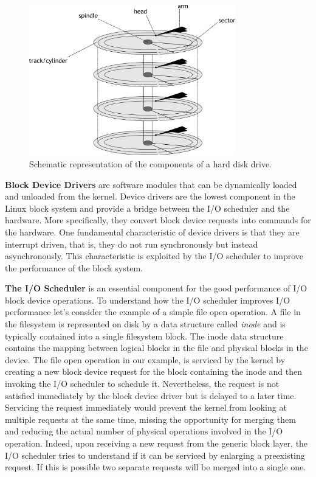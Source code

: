 \begin{figure}[!htb]
  \centering
  \includegraphics[width=0.8\textwidth]{chapters/figures/hdd}
  \caption{Schematic representation of the components of a hard disk drive.}
  \label{figure: hdd}
\end{figure}

\vspace{5mm}
\textbf{Block Device Drivers} are software modules that can be dynamically loaded and unloaded from the kernel. Device drivers are the lowest component in the Linux block system and provide a bridge
between the I/O scheduler and the hardware. More specifically, they convert block device requests into commands for the hardware. One fundamental characteristic of device drivers is that they are 
interrupt driven, that is, they do not run synchronously but instead asynchronously. This characteristic is exploited by the I/O scheduler to improve the performance of the block system.

\vspace{5mm}
\textbf{The I/O Scheduler} is an essential component for the good performance of I/O block device operations. To understand how the I/O scheduler improves I/O performance let's consider the example of 
a simple file open operation. A file in the filesystem is represented on disk by a data structure called \textit{inode} and is typically contained into a single filesystem block. The inode data structure 
contains the mapping between logical blocks in the file and physical blocks in the device. The file open operation in our example, is serviced by the kernel by creating a new block device request for the 
block containing the inode and then invoking the I/O scheduler to schedule it. Nevertheless, the request is not satisfied immediately by the block device driver but is delayed to a later time. Servicing 
the request immediately would prevent the kernel from looking at multiple requests at the same time, missing the opportunity for merging them and reducing the actual number of physical operations involved 
in the I/O operation. Indeed, upon receiving a new request from the generic block layer, the I/O scheduler tries to understand if it can be serviced by enlarging a preexisting request. If this is possible 
two separate requests will be merged into a single one. 

